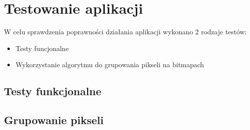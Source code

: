 \section{Testowanie aplikacji}

W celu sprawdzenia poprawności działania aplikacji wykonano 2 rodzaje testów:

\begin{itemize}
	\item Testy funcjonalne
	\item Wykorzystanie algorytmu do grupowania pikseli na bitmapach
\end{itemize}

\subsection{Testy funkcjonalne}

\subsection{Grupowanie pikseli}